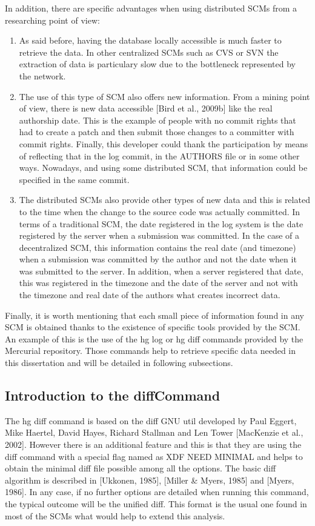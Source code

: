 \documentclass[a4paper, 12pt]{book}
\begin{document}
In addition, there are specific advantages when using distributed SCMs from a researching point of view:
\begin{enumerate}
	\item As said before, having the database locally accessible is much faster to retrieve the data. In other centralized SCMs such as CVS or SVN the extraction of data is particulary slow due to the bottleneck represented by the network.
	\item The use of this type of SCM also offers new information. From a mining point of view, there is new data accessible [Bird et al., 2009b] like the real authorship date. This is the example of people with no commit rights that had to create a patch and then submit those changes to a committer with commit rights. Finally, this developer could thank the participation by means of reflecting that in the log commit, in the AUTHORS file or in some other ways. Nowadays, and using some distributed SCM, that information could be specified in the same commit.
	\item The distributed SCMs also provide other types of new data and this is related to the time when the change to the source code was actually committed. In terms of a traditional SCM, the date registered in the log system is the date registered by the server when a submission was committed. In the case of a decentralized SCM, this information contains the real date (and timezone) when a submission was committed by the author and not the date when it was submitted to the server. In addition, when a server registered that date, this was registered in the timezone and the date of the server and not with the timezone and real date of the authors what creates incorrect data.
\end{enumerate}

Finally, it is worth mentioning that each small piece of information found in any SCM is obtained thanks to the existence of specific tools provided by the SCM. An example of this is the use of the hg log or hg diff commands provided by the Mercurial repository. Those commands help to retrieve specific data needed in this dissertation and will be detailed in following subsections.

\subsection{Introduction to the diffCommand}
The hg diff command is based on the diff GNU util developed by Paul Eggert, Mike Haertel, David Hayes, Richard Stallman and Len Tower [MacKenzie et al., 2002]. However there is an additional feature and this is that they are using the diff command with a special flag named as XDF NEED MINIMAL and helps to obtain the minimal diff file possible among all the options.
The basic diff algorithm is described in [Ukkonen, 1985], [Miller \& Myers, 1985] and [Myers, 1986]. In any case, if no further options are detailed when running this command, the typical outcome will be the unified diff. This format is the usual one found in most of the SCMs what would help to extend this analysis.
\end{document}
